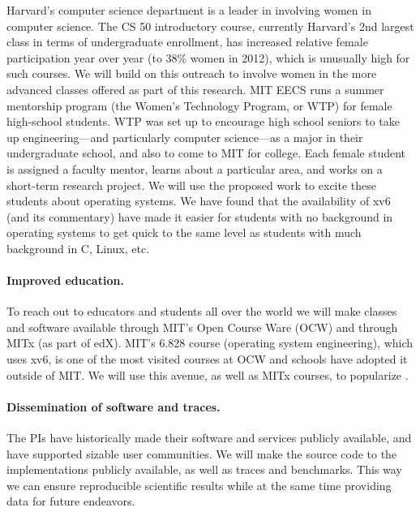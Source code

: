 Harvard's computer science department is a leader in involving women
in computer science.
%
The CS 50 introductory course, currently Harvard's 2nd largest class
in terms of undergraduate enrollment, has increased relative female
participation year over year (to 38\% women in 2012), which is
unusually high for such courses.
%
We will build on this outreach to involve women in the more advanced
classes offered as part of this research.
%
MIT EECS runs a summer mentorship program (the Women's Technology Program, or
WTP) for female high-school students.  WTP was set up to encourage high school
seniors to take up engineering---and particularly computer science---as a major
in their undergraduate school, and also to come to MIT for college.  Each female
student is assigned a faculty mentor, learns about a particular area, and works
on a short-term research project.  We will use the proposed work to excite these
students about operating systems.  We have found that the availability of xv6
(and its commentary) have made it easier for students with no background in
operating systems to get quick to the same level as students with much
background in C, Linux, etc.

\paragraph{Improved education.}

To reach out to educators and students all over the world we will make classes
and software available through MIT's Open Course Ware (OCW) and through MITx
(as part of edX). MIT's 6.828 course (operating system engineering), which
uses xv6, is one of the most visited courses at OCW and schools have
adopted it outside of MIT\@.  We will use this avenue, as well as MITx
courses, to popularize \sys.

\paragraph{Dissemination of software and traces.}

The PIs have historically made their software and services publicly available,
and have supported sizable user communities. We will make the source code to
the \sys implementations publicly available, as well as traces and
benchmarks. This way we can ensure reproducible scientific results while at the
same time providing data for future endeavors.

